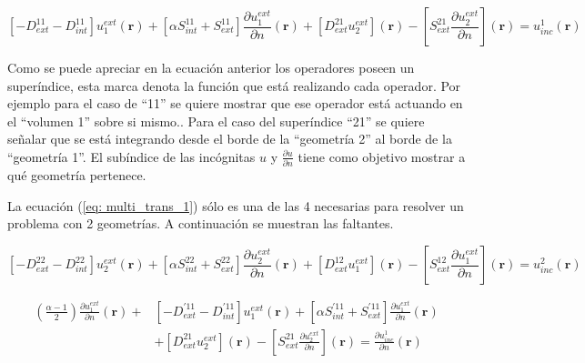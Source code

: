 \documentclass[12pt,letterpaper]{article}
\numberwithin{equation}{section}
\begin{document}
\begin{equation}
\left[-D_{ext}^{11} - D_{int}^{11}\right] u^{ext}_1(\textbf{r}) + \left[\alpha S_{int}^{11} + S_{ext}^{11}\right]\frac{\partial u^{ext}_1}{\partial n}(\textbf{r}) + \left[D_{ext}^{21} u^{ext}_2\right](\textbf{r}) - \left[S_{ext}^{21} \frac{\partial u^{ext}_2}{\partial n}\right](\textbf{r}) = u_{inc}^1(\textbf{r}) 
\label{eq: multi_trans_1}		
\end{equation}

\pagebreak
Como se puede apreciar en la ecuación anterior los operadores poseen un superíndice, esta marca denota la función que está realizando cada operador. Por ejemplo para el caso de ``11'' se quiere mostrar que ese operador está actuando en el ``volumen 1'' sobre si mismo.. Para el caso del superíndice ``21'' se quiere señalar que se está integrando desde el borde de la ``geometría 2'' al borde de la ``geometría 1''. El subíndice de las incógnitas $u$ y $\frac{\partial u}{\partial n}$ tiene como objetivo mostrar a qué geometría pertenece. 

La ecuación (\ref{eq: multi_trans_1}) sólo es una de las 4 necesarias para resolver un problema con 2 geometrías. A continuación se muestran las faltantes.

\begin{equation}
\left[-D_{ext}^{22} - D_{int}^{22}\right] u^{ext}_2(\textbf{r}) + \left[\alpha S_{int}^{22} + S_{ext}^{22}\right]\frac{\partial u^{ext}_2}{\partial n}(\textbf{r}) + \left[D_{ext}^{12} u^{ext}_1\right](\textbf{r}) - \left[S_{ext}^{12} \frac{\partial u^{ext}_1}{\partial n}\right](\textbf{r}) = u_{inc}^2(\textbf{r}) 
\label{eq: multi_trans_2}		
\end{equation}

\begin{equation}
\begin{split}
(\frac{\alpha - 1}{2})\frac{\partial u^{ext}_1}{\partial n}(\textbf{r}) + &\left[-D_{ext}^{'11} - D_{int}^{'11}\right] u^{ext}_1(\textbf{r}) + \left[\alpha S_{int}^{'11} + S_{ext}^{'11}\right]\frac{\partial u^{ext}_1}{\partial n}(\textbf{r})\\
&+ \left[D_{ext}^{21} u^{ext}_2\right](\textbf{r}) - \left[S_{ext}^{21} \frac{\partial u^{ext}_2}{\partial n}\right](\textbf{r}) = \frac{\partial u_{inc}^1}{\partial n}(\textbf{r}) 
\end{split}
\label{eq: multi_trans_deriv_1}		
\end{equation}
\end{document}
